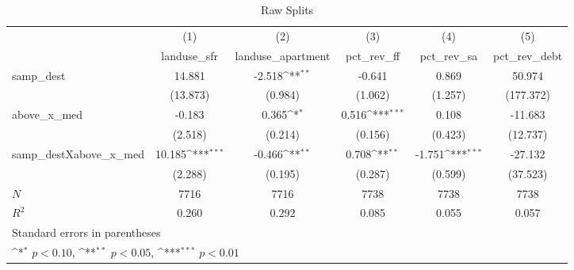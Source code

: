 \begin{table}[htbp]\centering
\def\sym#1{\ifmmode^{#1}\else\(^{#1}\)\fi}
\caption{Raw Splits}
\begin{tabular}{l*{5}{c}}
\hline\hline
            &\multicolumn{1}{c}{(1)}&\multicolumn{1}{c}{(2)}&\multicolumn{1}{c}{(3)}&\multicolumn{1}{c}{(4)}&\multicolumn{1}{c}{(5)}\\
            &\multicolumn{1}{c}{landuse\_sfr}&\multicolumn{1}{c}{landuse\_apartment}&\multicolumn{1}{c}{pct\_rev\_ff}&\multicolumn{1}{c}{pct\_rev\_sa}&\multicolumn{1}{c}{pct\_rev\_debt}\\
\hline
samp\_dest   &      14.881         &      -2.518\sym{**} &      -0.641         &       0.869         &      50.974         \\
            &    (13.873)         &     (0.984)         &     (1.062)         &     (1.257)         &   (177.372)         \\
[1em]
above\_x\_med &      -0.183         &       0.365\sym{*}  &       0.516\sym{***}&       0.108         &     -11.683         \\
            &     (2.518)         &     (0.214)         &     (0.156)         &     (0.423)         &    (12.737)         \\
[1em]
samp\_destXabove\_x\_med&      10.185\sym{***}&      -0.466\sym{**} &       0.708\sym{**} &      -1.751\sym{***}&     -27.132         \\
            &     (2.288)         &     (0.195)         &     (0.287)         &     (0.599)         &    (37.523)         \\
\hline
\(N\)       &        7716         &        7716         &        7738         &        7738         &        7738         \\
\(R^{2}\)   &       0.260         &       0.292         &       0.085         &       0.055         &       0.057         \\
\hline\hline
\multicolumn{6}{l}{\footnotesize Standard errors in parentheses}\\
\multicolumn{6}{l}{\footnotesize \sym{*} \(p<0.10\), \sym{**} \(p<0.05\), \sym{***} \(p<0.01\)}\\
\end{tabular}
\end{table}
